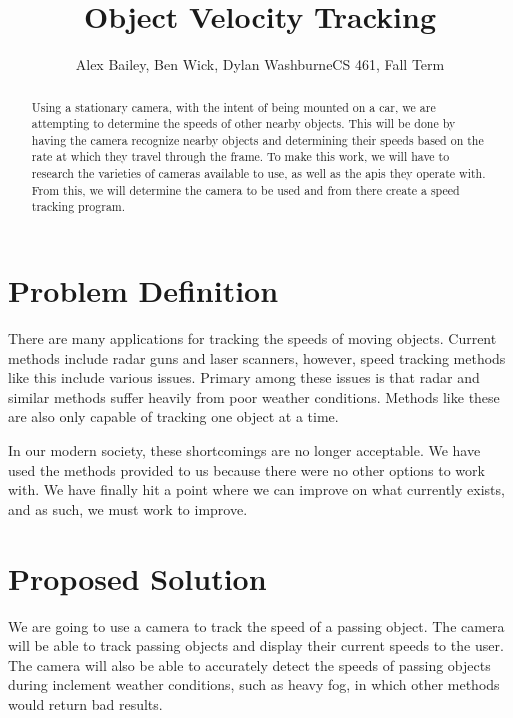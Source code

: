 \documentclass[letterpaper,10pt,onecolumn,draftclsnofoot]{IEEEtran}
\title{Object Velocity Tracking}
\author{Alex Bailey, Ben Wick, Dylan WashburneCS 461, Fall Term}
\begin{document}
\begin{titlepage}

\maketitle

\begin{abstract}
Using a stationary camera, with the intent of being mounted on a car, we are attempting to determine the speeds of other nearby objects.
This will be done by having the camera recognize nearby objects and determining their speeds based on the rate at which they travel through the frame.
To make this work, we will have to research the varieties of cameras available to use, as well as the apis they operate with.
From this, we will determine the camera to be used and from there create a speed tracking program.
\end{abstract}

\end{titlepage}

\section{Problem Definition}

There are many applications for tracking the speeds of moving objects.
Current methods include radar guns and laser scanners, however, speed tracking methods like this include various issues.
Primary among these issues is that radar and similar methods suffer heavily from poor weather conditions.
Methods like these are also only capable of tracking one object at a time.

In our modern society, these shortcomings are no longer acceptable.
We have used the methods provided to us because there were no other options to work with.
We have finally hit a point where we can improve on what currently exists, and as such, we must work to improve.


\section{Proposed Solution}

We are going to use a camera to track the speed of a passing object.
The camera will be able to track passing objects and display their current speeds to the user.
The camera will also be able to accurately detect the speeds of passing objects during inclement weather conditions, such as heavy fog, in which other methods would return bad results.
\end{document}
